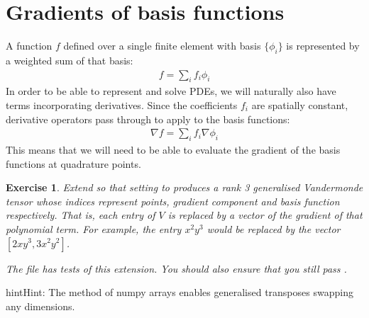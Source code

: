 \documentclass{book}
\newtheorem{exercise}{Exercise}
\begin{document}
\section{Gradients of basis functions}
\label{\detokenize{2_finite_elements:gradients-of-basis-functions}}
A function \(f\) defined over a single finite element with basis
\(\{\phi_i\}\) is represented by a weighted sum of that basis:
\begin{equation*}
\begin{split}f = \sum_i f_i\phi_i\end{split}
\end{equation*}
In order to be able to represent and solve PDEs, we will naturally
also have terms incorporating derivatives. Since the coefficients
\(f_i\) are spatially constant, derivative operators pass through to
apply to the basis functions:
\begin{equation*}
\begin{split}\nabla f  = \sum_i f_i\nabla\phi_i\end{split}
\end{equation*}
This means that we will need to be able to evaluate the gradient of
the basis functions at quadrature points.

\begin{exercise}
Extend  so that
setting  to  produces a rank 3 generalised
Vandermonde tensor whose indices represent points, gradient
component and basis function respectively. That is, each entry of
\(V\) is replaced by a vector of the gradient of that polynomial
term. For example, the entry \(x^2y^3\) would be replaced by the
vector \([ 2xy^3, 3x^2y^2 ]\).

The  file has tests of this
extension. You should also ensure that you still pass
.
\end{exercise}
\begin{sphinxadmonition}{hint}{Hint:}
The  method of numpy arrays enables
generalised transposes swapping any dimensions.
\end{sphinxadmonition}
\end{document}
